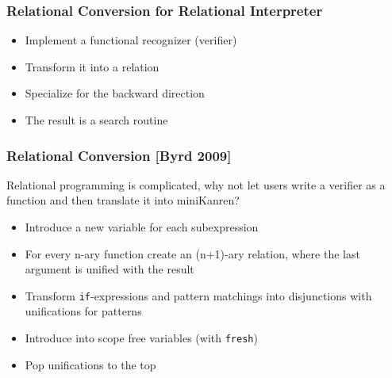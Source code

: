\documentclass[xcolor=table]{beamer}
\begin{document}
\begin{frame}[fragile]
  \transwipe[direction=90]
  \frametitle{Relational Conversion for Relational Interpreter}
\begin{itemize}
  \item Implement a functional recognizer (verifier)
  \item Transform it into a relation
  \item Specialize for the backward direction
  \item The result is a search routine
\end{itemize}
\end{frame}

\begin{frame}[fragile]
  \transwipe[direction=90]
  \frametitle{Relational Conversion [Byrd 2009]}

Relational programming is complicated, why not let users write a verifier as a function and then translate it into miniKanren?

\begin{itemize}
  \item Introduce a new variable for each subexpression
  \item For every n-ary function create an (n+1)-ary relation, where the last argument is unified with the result
  \item Transform \lstinline{if}-expressions and pattern matchings into disjunctions with unifications for patterns
  \item Introduce into scope free variables (with \lstinline{fresh})
  \item Pop unifications to the top
\end{itemize}
\end{frame}
\end{document}
